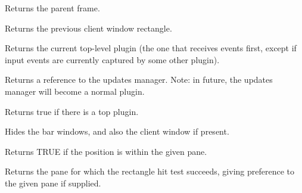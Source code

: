 \label{wxframelayoutgetparentframe}


Returns the parent frame.


\label{wxframelayoutgetprevclientrect}


Returns the previous client window rectangle.


\label{wxframelayoutgettopplugin}


Returns the current top-level plugin (the one that receives events first,
except if input events are currently captured by some other plugin).


\label{wxframelayoutgetupdatesmanager}


Returns a reference to the updates manager.
Note: in future, the updates manager will become a normal plugin.


\label{wxframelayouthastopplugin}


Returns true if there is a top plugin.


\label{wxframelayouthidebarwindows}


Hides the bar windows, and also the client window if present.


\label{wxframelayouthittestpane}


Returns TRUE if the position is within the given pane.


\label{wxframelayouthittestpanes}


Returns the pane for which the rectangle hit test succeeds, giving
preference to the given pane if supplied.


